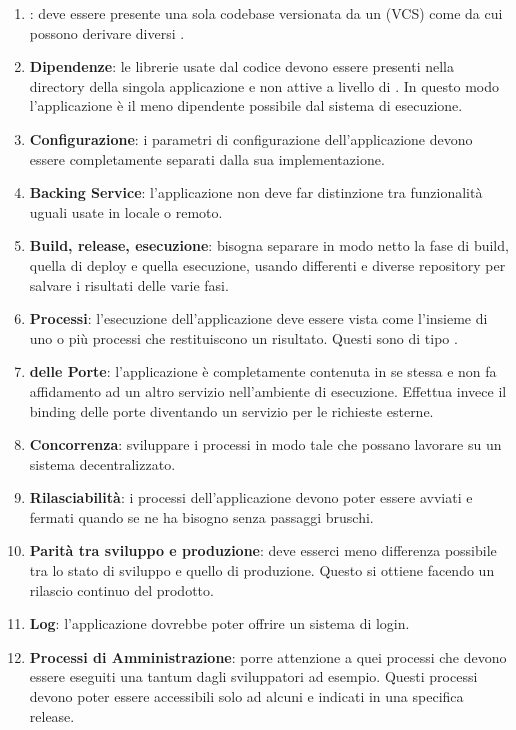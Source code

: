 		\begin{enumerate}
			\item \textbf{}: deve essere presente una sola codebase versionata da un  (VCS) come  da cui
			possono derivare diversi .
			\item \textbf{Dipendenze}: le librerie usate dal codice devono essere presenti nella directory della singola applicazione e non attive a livello di . In questo modo l'applicazione è il meno dipendente possibile dal sistema di esecuzione.
			\item \textbf{Configurazione}: i parametri di configurazione dell'applicazione devono essere completamente separati dalla sua implementazione.
			\item \textbf{Backing Service}: l'applicazione non deve far distinzione tra funzionalità uguali usate in locale o remoto.
			\item \textbf{Build, release, esecuzione}: bisogna separare in modo netto la fase di build, quella di deploy e quella esecuzione, usando  differenti e diverse repository per salvare i risultati delle varie fasi.
			\item \textbf{Processi}: l'esecuzione dell'applicazione deve essere vista come l'insieme di uno o più processi che restituiscono un risultato. Questi sono di tipo .
			\item \textbf{ delle Porte}: l'applicazione è completamente contenuta in se stessa e non fa affidamento ad un altro servizio nell'ambiente di esecuzione. Effettua invece il binding delle porte diventando un servizio per le richieste esterne.
			\item \textbf{Concorrenza}: sviluppare i processi in modo tale che possano lavorare su un sistema decentralizzato.
			\item \textbf{Rilasciabilità}: i processi dell'applicazione devono poter essere avviati e fermati quando se ne ha bisogno senza passaggi bruschi.
			\item \textbf{Parità tra sviluppo e produzione}: deve esserci meno differenza possibile tra lo stato di sviluppo e quello di produzione. Questo si ottiene facendo un rilascio continuo del prodotto.
			\item \textbf{Log}: l'applicazione dovrebbe poter offrire un sistema di login.
			\item \textbf{Processi di Amministrazione}: porre attenzione a quei processi che devono essere eseguiti una tantum dagli sviluppatori ad esempio. Questi processi devono poter essere accessibili solo ad alcuni e indicati in una specifica release.
		\end{enumerate}
		
